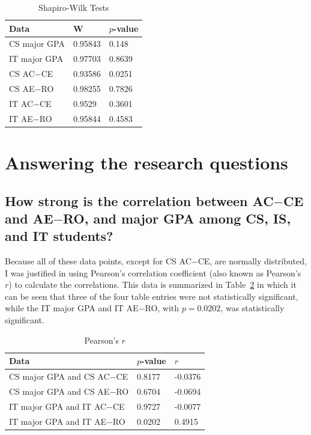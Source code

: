 \begin{table}[!htbp]
  \centering
  \caption{Shapiro-Wilk Tests}
  \label{tab:shapiro-wilk}
  \begin{tabular}{lll}
    \toprule
    Data         & W       & $p$-value \\
    \midrule
    CS major GPA & 0.95843 & 0.148  \\
    IT major GPA & 0.97703 & 0.8639 \\
    CS AC$-$CE   & 0.93586 & 0.0251 \\
    CS AE$-$RO   & 0.98255 & 0.7826 \\
    IT AC$-$CE   & 0.9529  & 0.3601 \\
    IT AE$-$RO   & 0.95844 & 0.4583 \\
    \bottomrule
  \end{tabular}
\end{table}

\section{Answering the research questions}
\subsection{How strong is the correlation between AC$-$CE and AE$-$RO, and major GPA among CS, IS, and IT students?}
Because all of these data points, except for CS AC$-$CE, are normally distributed, I was justified in using Pearson's correlation coefficient (also known as Pearson's $r$) to calculate the correlations. This data is summarized in Table~\ref{tab:pearsons} in which it can be seen that three of the four table entries were not statistically significant, while the IT major GPA and IT AE$-$RO, with $p=0.0202$, was statistically significant.

\begin{table}[!htbp]
  \centering
  \caption{Pearson's $r$}
  \label{tab:pearsons}
  \begin{tabular}{lll}
    \toprule
    Data                        & $p$-value & $r$ \\
    \midrule
    CS major GPA and CS AC$-$CE & 0.8177    & -0.0376 \\
    CS major GPA and CS AE$-$RO & 0.6704    & -0.0694 \\
    IT major GPA and IT AC$-$CE & 0.9727    & -0.0077 \\
    IT major GPA and IT AE$-$RO & 0.0202    & 0.4915  \\
    \bottomrule
  \end{tabular}
\end{table}

